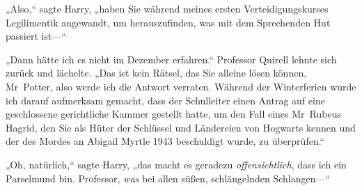 „Also,“ sagte Harry, „haben Sie während meines ersten Verteidigungskurses Legilimentik angewandt, um herauszufinden, was mit dem Sprechenden Hut passiert ist—“

„Dann hätte ich es nicht im Dezember erfahren.“ Professor Quirell lehnte sich zurück und lächelte. „Das ist kein Rätsel, das Sie alleine lösen können, Mr~Potter, also werde ich die Antwort verraten. Während der Winterferien wurde ich darauf aufmerksam gemacht, dass der Schulleiter einen Antrag auf eine geschlossene gerichtliche Kammer gestellt hatte, um den Fall eines Mr~Rubeus Hagrid, den Sie als Hüter der Schlüssel und Ländereien von Hogwarts kennen und der des Mordes an Abigail Myrtle 1943 beschuldigt wurde, zu überprüfen.“

„Oh, natürlich,“ sagte Harry, „das macht es geradezu \emph{offensichtlich}, dass ich ein Parselmund bin. Professor, \emph{was} bei allen süßen, schlängelnden Schlangen—“

